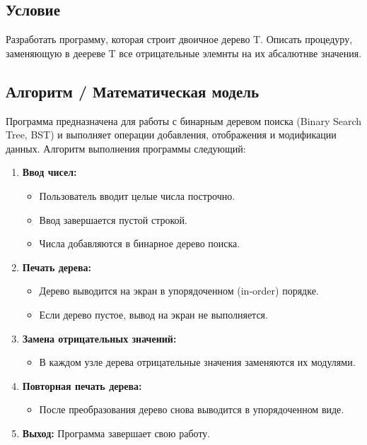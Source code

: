 \documentclass[a4paper,12pt]{article}
\begin{document}
\subsection{Условие}
Разработать программу, которая строит двоичное дерево T. Описать процедуру, заменяющую в деереве T все отрицательные элемнты
на их абсалютнве значения.
\subsection{Алгоритм / Математическая модель}

Программа предназначена для работы с бинарным деревом поиска (Binary Search Tree, BST) и выполняет операции добавления, отображения и модификации данных. Алгоритм выполнения программы следующий:

\begin{enumerate}
\item \textbf{Ввод чисел:}
\begin{itemize}
\item Пользователь вводит целые числа построчно.
\item Ввод завершается пустой строкой.
\item Числа добавляются в бинарное дерево поиска.
\end{itemize}

\item \textbf{Печать дерева:}
\begin{itemize}
\item Дерево выводится на экран в упорядоченном (in-order) порядке.
\item Если дерево пустое, вывод на экран не выполняется.
\end{itemize}

\item \textbf{Замена отрицательных значений:}
\begin{itemize}
\item В каждом узле дерева отрицательные значения заменяются их модулями.
\end{itemize}

\item \textbf{Повторная печать дерева:}
\begin{itemize}
\item После преобразования дерево снова выводится в упорядоченном виде.
\end{itemize}

\item \textbf{Выход:} Программа завершает свою работу.
\end{enumerate}
\end{document}
